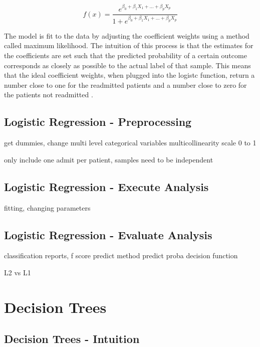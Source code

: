 \documentclass[sigconf]{acmart}
\begin{document}
\[ f(x) =\frac{e^{\beta_0 + \beta_1X_1 + ... + \beta_pX_p}}{1 + e^{\beta_0 + \beta_1X_1 + ... + \beta_pX_p}}  \]

The model is fit to the data by adjusting the coefficient weights using a method called maximum likelihood. The intuition of this process is that the estimates for the coefficients are set such that the predicted probability of a certain outcome corresponds as closely as possible to the actual label of that sample. This means that the ideal coefficient weights, when plugged into the logistc function, return a number close to one for the readmitted patients and a number close to zero for the patients not readmitted \cite{cite08}.

\subsection{Logistic Regression - Preprocessing}


get dummies, change multi level categorical variables
multicollinearity
scale 0 to 1

only include one admit per patient, samples need to be independent

\subsection{Logistic Regression - Execute Analysis}
fitting, changing parameters

\subsection{Logistic Regression - Evaluate Analysis}

classification reports, f score
predict method
predict proba
decision function

L2 vs L1

\section{Decision Trees}

\subsection{Decision Trees - Intuition}
\end{document}
